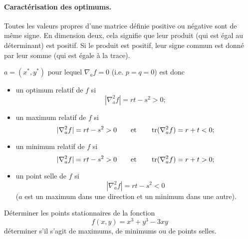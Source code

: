 \paragraph*{Caractérisation des optimums.}
Toutes les valeurs propres d'une matrice définie positive ou négative sont de même signe. 
En dimension deux, cela signifie que leur produit (qui est égal au déterminant) est positif. Si le produit est positif, leur signe commun est donné par leur somme (qui est égale à la trace).

$a = (x^*, y^*)$ pour lequel $\nabla_a f = 0$ (i.e. $p = q = 0$) est donc
\begin{itemize}
  \item un optimum relatif de $f$ si 
  $$
  |\nabla^2_a f| = rt - s^2 > 0 ;
  $$
  \item un maximum relatif de $f$ si 
  $$
  |\nabla^2_a f| = rt - s^2 > 0 
  \qquad \text{et} \qquad
  \operatorname{tr}(\nabla^2_a f) = r + t < 0 ;
  $$
  \item un minimum relatif de $f$ si 
  $$
  |\nabla^2_a f| = rt - s^2 > 0 
  \qquad \text{et} \qquad
  \operatorname{tr}(\nabla^2_a f) = r + t > 0 ;
  $$
  \item un point selle de $f$ si 
  $$
  |\nabla^2_a f| = rt - s^2 < 0
  $$
  ($a$ est un maximum dans une direction et un minimum dans une autre).
\end{itemize}


\begin{exercise*}
  Déterminer les points stationnaires de la fonction 
  $$
  f(x, y) = x^3 + y^3 - 3 xy
  $$
  déterminer s'il s'agit de maximums, de minimums ou de points selles.
\end{exercise*}

